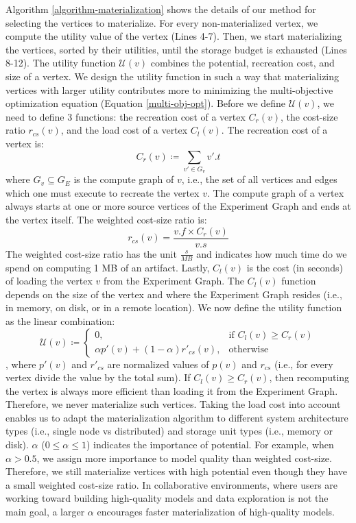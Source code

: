 Algorithm \ref{algorithm-materialization} shows the details of our method for selecting the vertices to materialize.
For every non-materialized vertex, we compute the utility value of the vertex (Lines 4-7).
Then, we start materializing the vertices, sorted by their utilities, until the storage budget is exhausted (Lines 8-12).
The utility function $\mathcal{U}(v)$ combines the potential, recreation cost, and size of a vertex.
We design the utility function in such a way that materializing vertices with larger utility contributes more to minimizing the multi-objective optimization equation (Equation \ref{multi-obj-opt}).
Before we define $\mathcal{U}(v)$, we need to define 3 functions: the recreation cost of a vertex $C_r(v)$, the cost-size ratio $r_{cs}(v)$, and the load cost of a vertex $C_l(v)$.
The recreation cost of a vertex is:
\[
C_r(v) \coloneqq \sum\limits_{v' \in G_v} v'.t
\]
where $G_v \subseteq G_E$ is the compute graph of $v$, i.e., the set of all vertices and edges which one must execute to recreate the vertex $v$.
The compute graph of a vertex always starts at one or more source vertices of the Experiment Graph and ends at the vertex itself.
The weighted cost-size ratio is:
\[r_{cs}(v) = \frac{v.f  \times C_r(v)}{v.s}\]
The weighted cost-size ratio has the unit $\tfrac{s}{MB}$ and indicates how much time do we spend on computing 1 MB of an artifact.
Lastly, $C_l(v)$ is the cost (in seconds) of loading the vertex $v$ from the Experiment Graph. 
The $C_l(v)$ function depends on the size of the vertex and where the Experiment Graph resides (i.e., in memory, on disk, or in a remote location).
We now define the utility function as the linear combination: 
\[
\mathcal{U}(v) \coloneqq  	
		\begin{cases}
		0, & \text{if }  C_l(v) \ge C_r(v)  \\ 
		\alpha p'(v) + (1-\alpha)r'_{cs}(v), & \text{otherwise}
		\end{cases}
\],
where $p'(v)$ and $r'_{cs}$ are normalized values of $p(v)$ and $r_{cs}$ (i.e., for every vertex divide the value by the total sum).
If $C_l(v) \ge C_r(v)$, then recomputing the vertex is always more efficient than loading it from the Experiment Graph.
Therefore, we never materialize such vertices.
Taking the load cost into account enables us to adapt the materialization algorithm to different system architecture types (i.e., single node vs distributed) and storage unit types (i.e., memory or disk).
$ \alpha$ ($0 \leq \alpha \leq 1$) indicates the importance of potential.
For example, when $\alpha > 0.5$, we assign more importance to model quality than weighted cost-size.
Therefore, we still materialize vertices with high potential even though they have a small weighted cost-size ratio.
In collaborative environments, where users are working toward building high-quality models and data exploration is not the main goal, a larger $\alpha$ encourages faster materialization of high-quality models.

